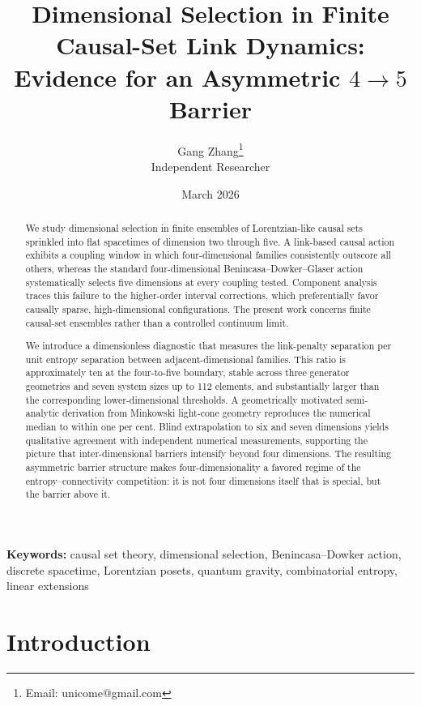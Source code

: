 \documentclass[12pt,a4paper]{article}
\title{Dimensional Selection in Finite Causal-Set Link Dynamics:\\
Evidence for an Asymmetric $4{\to}5$ Barrier}
\author{Gang Zhang\thanks{Email: unicome@gmail.com}\\
\small Independent Researcher}
\date{March 2026}
\begin{document}
\maketitle

\begin{abstract}
We study dimensional selection in finite ensembles of Lorentzian-like
causal sets sprinkled into flat spacetimes of dimension two through five.
A link-based causal action exhibits a coupling window
in which four-dimensional families consistently outscore all others,
whereas the standard four-dimensional Benincasa--Dowker--Glaser action
systematically selects five dimensions at every coupling tested.
Component analysis traces this failure to the higher-order interval
corrections, which preferentially favor causally sparse,
high-dimensional configurations.
The present work concerns finite causal-set ensembles rather than
a controlled continuum limit.

We introduce a dimensionless diagnostic that measures
the link-penalty separation per unit entropy separation between
adjacent-dimensional families.
This ratio is approximately ten at the four-to-five boundary,
stable across three generator geometries and seven system sizes
up to 112 elements, and substantially larger than the corresponding
lower-dimensional thresholds.
A geometrically motivated semi-analytic derivation from Minkowski
light-cone geometry reproduces the numerical median to within
one per cent.
Blind extrapolation to six and seven dimensions yields qualitative
agreement with independent numerical measurements, supporting the
picture that inter-dimensional barriers intensify beyond four dimensions.
The resulting asymmetric barrier structure makes four-dimensionality
a favored regime of the entropy--connectivity competition:
it is not four dimensions itself that is special, but the barrier above it.
\end{abstract}

\noindent\textbf{Keywords:} causal set theory, dimensional selection,
Benincasa--Dowker action, discrete spacetime, Lorentzian posets,
quantum gravity, combinatorial entropy, linear extensions

\tableofcontents
\newpage

\section{Introduction}
\label{sec:introduction}
\end{document}

